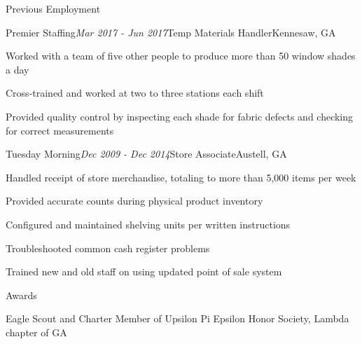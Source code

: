 \documentclass[11pt]{resume} %
\begin{document}

\begin{rSection}{Previous Employment}

\begin{rSubsection}{Premier Staffing}{\em Mar 2017 - Jun 2017}{Temp Materials Handler}{Kennesaw, GA}
\item Worked with a team of five other people to produce more than 50 window shades a day
\item Cross-trained and worked at two to three stations each shift
\item Provided quality control by inspecting each shade for fabric defects and checking for correct measurements
\end{rSubsection}

\begin{rSubsection}{Tuesday Morning}{\em Dec 2009 - Dec 2014}{Store Associate}{Austell, GA}
\item Handled receipt of store merchandise, totaling to more than 5,000 items per week
\item Provided accurate counts during physical product inventory
\item Configured and maintained shelving units per written instructions
\item Troubleshooted common cash register problems
\item Trained new and old staff on using updated point of sale system
\end{rSubsection}

\end{rSection}


\begin{rSection}{Awards}

{Eagle Scout} and {Charter Member of Upsilon Pi Epsilon Honor Society, Lambda chapter of GA}

\end{rSection}






\end{document}
